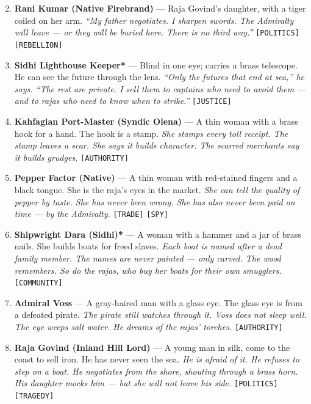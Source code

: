 \begin{enumerate}
\setcounter{enumi}{1}
\item \textbf{Rani Kumar (Native Firebrand)\textdagger} --- Raja Govind's daughter, with a tiger coiled on her arm.
  \hfill \textit{``My father negotiates. I sharpen swords. The Admiralty will leave --- or they will be buried here. There is no third way.''} \texttt{[POLITICS]} \texttt{[REBELLION]}
\item \textbf{Sidhi Lighthouse Keeper*} --- Blind in one eye; carries a brass telescope. He can see the future through the lens.
  \hfill \textit{``Only the futures that end at sea,'' he says. ``The rest are private. I sell them to captains who need to avoid them --- and to rajas who need to know when to strike.''} \texttt{[JUSTICE]}
\item \textbf{Kahfagian Port-Master (Syndic Olena)\textdaggerdbl} --- A thin woman with a brass hook for a hand. The hook is a stamp.
  \hfill \textit{She stamps every toll receipt. The stamp leaves a scar. She says it builds character. The scarred merchants say it builds grudges.} \texttt{[AUTHORITY]}
\item \textbf{Pepper Factor (Native)\textdagger} --- A thin woman with red-stained fingers and a black tongue. She is the raja's eyes in the market.
  \hfill \textit{She can tell the quality of pepper by taste. She has never been wrong. She has also never been paid on time --- by the Admiralty.} \texttt{[TRADE]} \texttt{[SPY]}
\item \textbf{Shipwright Dara (Sidhi)*} --- A woman with a hammer and a jar of brass nails. She builds boats for freed slaves.
  \hfill \textit{Each boat is named after a dead family member. The names are never painted --- only carved. The wood remembers. So do the rajas, who buy her boats for their own smugglers.} \texttt{[COMMUNITY]}
\item \textbf{Admiral Voss\textdaggerdbl} --- A gray-haired man with a glass eye. The glass eye is from a defeated pirate.
  \hfill \textit{The pirate still watches through it. Voss does not sleep well. The eye weeps salt water. He dreams of the rajas' torches.} \texttt{[AUTHORITY]}
\item \textbf{Raja Govind (Inland Hill Lord)\textdagger} --- A young man in silk, come to the coast to sell iron. He has never seen the sea.
  \hfill \textit{He is afraid of it. He refuses to step on a boat. He negotiates from the shore, shouting through a brass horn. His daughter mocks him --- but she will not leave his side.} \texttt{[POLITICS]} \texttt{[TRAGEDY]}

\end{enumerate}

